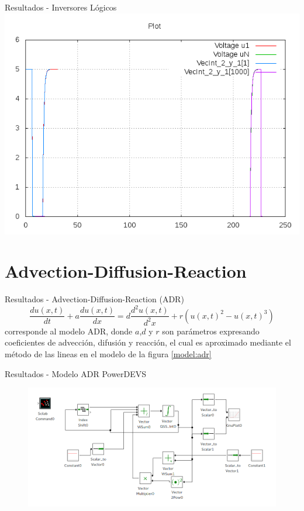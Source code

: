 \documentclass{beamer}
\begin{document}
\begin{frame}{Resultados - Inversores Lógicos}
 \includegraphics[width=\linewidth]{output/inverters/inverters-all}
\end{frame}

\section{Advection-Diffusion-Reaction}
\begin{frame}{Resultados - Advection-Diffusion-Reaction (ADR)}
\begin{equation*}
\frac{du(x,t)}{dt} + a \frac{du(x,t)}{dx} = d\frac{d^2u(x,t)}{d^2x} + r(u(x,t)^2 - u(x,t)^3)
\end{equation*}
corresponde al modelo ADR, donde $a$,$d$ y $r$ son parámetros expresando coeficientes de advección, difusión y reacción, 
el cual es aproximado mediante el método de las lineas \cite{BKP13} en el modelo de la figura \ref{model:adr}
\end{frame}

\begin{frame}{Resultados - Modelo ADR PowerDEVS}
\begin{figure}[H]
 \includegraphics[width=\linewidth]{adr-pwd}
\end{figure}
\end{frame}
\end{document}
